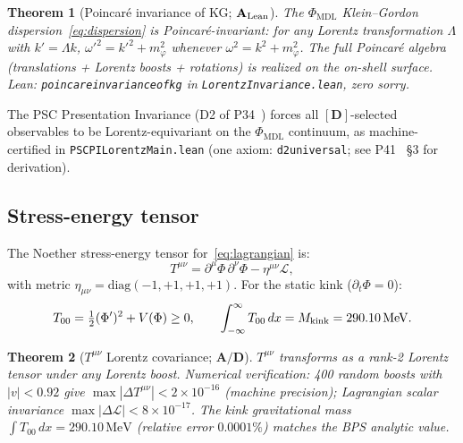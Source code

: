 \documentclass[11pt]{article}
\newtheorem{theorem}{Theorem}[section]
\theoremstyle{remark}
\newcommand{\PHIMDL}{\Phi_{\mathrm{MDL}}}
\newcommand{\lean}[1]{%
  \penalty-100
  \begingroup\def\_{\textunderscore\allowbreak}\texttt{#1}\endgroup}
\newcommand{\Mkink}{M_{\rm kink}}
\newcommand{\CatAL}{\ensuremath{\textbf{A}_{\rm Lean}}}
\newcommand{\CatAD}{\textbf{A/D}}
\begin{document}
\begin{theorem}[Poincar\'e invariance of KG; $\CatAL$]
  \label{thm:poincare}
  The $\PHIMDL$ Klein--Gordon dispersion~\eqref{eq:dispersion} is
  Poincar\'e-invariant: for any Lorentz transformation $\Lambda$ with
  $k' = \Lambda k$, $\omega'^2 = k'^2 + m_\varphi^2$ whenever $\omega^2 = k^2 + m_\varphi^2$.
  The full Poincar\'e algebra (translations + Lorentz boosts + rotations) is
  realized on the on-shell surface.
  Lean: \lean{poincare\_invariance\_of\_kg} in \lean{LorentzInvariance.lean},
  zero sorry.
\end{theorem}

The PSC Presentation Invariance (D2 of P34~\cite{SpivackGTEMobius}) forces all
$[\mathbf{D}]$-selected observables to be Lorentz-equivariant on the $\PHIMDL$
continuum, as machine-certified in \lean{PSCPILorentzMain.lean}
(one axiom: \lean{d2\_universal}; see P41~\cite{SpivackCMCA} \S3 for derivation).

\subsection{Stress-energy tensor}
\label{ssec:tmunu}

The Noether stress-energy tensor for~\eqref{eq:lagrangian} is:
\begin{equation}
  T^{\mu\nu} = \partial^\mu\Phi\,\partial^\nu\Phi - \eta^{\mu\nu}\mathcal{L},
  \label{eq:tmunu}
\end{equation}
with metric $\eta_{\mu\nu}=\mathrm{diag}(-1,+1,+1,+1)$.  For the static kink
($\partial_t\Phi=0$):
\begin{equation}
  T_{00} = \tfrac{1}{2}(\Phi')^2 + V(\Phi)\geq 0,
  \qquad
  \int_{-\infty}^{\infty}T_{00}\,dx = \Mkink = 290.10\,\mathrm{MeV}.
\end{equation}

\begin{theorem}[$T^{\mu\nu}$ Lorentz covariance; $\CatAD$]
  \label{thm:tmunu}
  $T^{\mu\nu}$ transforms as a rank-2 Lorentz tensor under any Lorentz boost.
  Numerical verification: 400 random boosts with $|v|<0.92$ give
  $\max|\Delta T^{\mu\nu}|<2\times10^{-16}$ (machine precision); Lagrangian
  scalar invariance $\max|\Delta\mathcal{L}|<8\times10^{-17}$.
  The kink gravitational mass $\int T_{00}\,dx = 290.10\,\mathrm{MeV}$ (relative
  error $0.0001\%$) matches the BPS analytic value.
\end{theorem}

\end{document}
